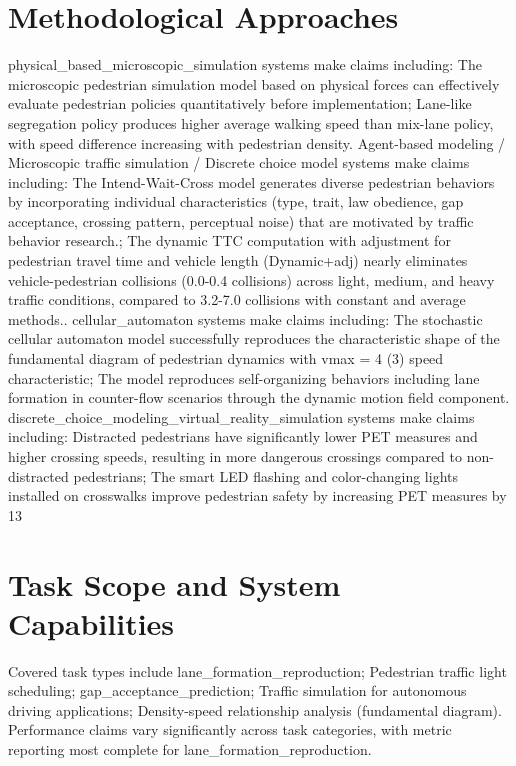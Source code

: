 \documentclass{article}
\begin{document}
\section{Methodological Approaches}
physical_based_microscopic_simulation systems make claims including: The microscopic pedestrian simulation model based on physical forces can effectively evaluate pedestrian policies quantitatively before implementation; Lane-like segregation policy produces higher average walking speed than mix-lane policy, with speed difference increasing with pedestrian density. Agent-based modeling / Microscopic traffic simulation / Discrete choice model systems make claims including: The Intend-Wait-Cross model generates diverse pedestrian behaviors by incorporating individual characteristics (type, trait, law obedience, gap acceptance, crossing pattern, perceptual noise) that are motivated by traffic behavior research.; The dynamic TTC computation with adjustment for pedestrian travel time and vehicle length (Dynamic+adj) nearly eliminates vehicle-pedestrian collisions (0.0-0.4 collisions) across light, medium, and heavy traffic conditions, compared to 3.2-7.0 collisions with constant and average methods.. cellular_automaton systems make claims including: The stochastic cellular automaton model successfully reproduces the characteristic shape of the fundamental diagram of pedestrian dynamics with vmax = 4 (3) speed characteristic; The model reproduces self-organizing behaviors including lane formation in counter-flow scenarios through the dynamic motion field component. discrete_choice_modeling_virtual_reality_simulation systems make claims including: Distracted pedestrians have significantly lower PET measures and higher crossing speeds, resulting in more dangerous crossings compared to non-distracted pedestrians; The smart LED flashing and color-changing lights installed on crosswalks improve pedestrian safety by increasing PET measures by 13%

\section{Task Scope and System Capabilities}
Covered task types include lane_formation_reproduction; Pedestrian traffic light scheduling; gap_acceptance_prediction; Traffic simulation for autonomous driving applications; Density-speed relationship analysis (fundamental diagram). Performance claims vary significantly across task categories, with metric reporting most complete for lane_formation_reproduction.
\end{document}
